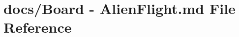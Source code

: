 \hypertarget{Board_01-_01AlienFlight_8md}{\section{docs/\+Board -\/ Alien\+Flight.\+md File Reference}
\label{Board_01-_01AlienFlight_8md}
}
